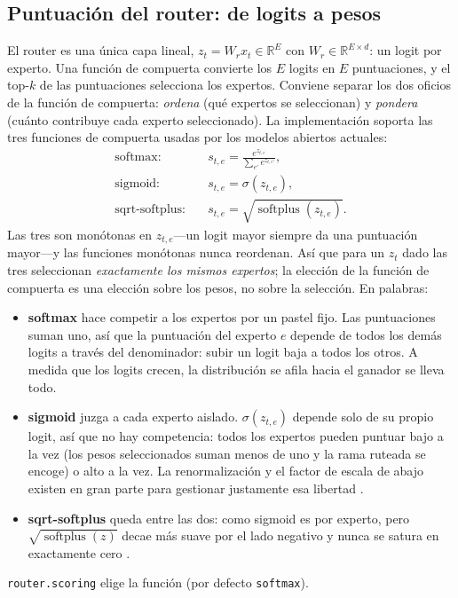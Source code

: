 \subsection{Puntuación del router: de logits a pesos}
\label{app:moe-router-es}

El router es una única capa lineal, $z_t = W_r x_t \in \mathbb{R}^{E}$ con
$W_r \in \mathbb{R}^{E \times d}$: un logit por experto. Una función de
compuerta convierte los $E$ logits en $E$ puntuaciones, y el top-$k$ de las
puntuaciones selecciona los expertos. Conviene separar los dos oficios de la
función de compuerta: \emph{ordena} (qué expertos se seleccionan) y
\emph{pondera} (cuánto contribuye cada experto seleccionado). La implementación
soporta las tres funciones de compuerta usadas por los modelos abiertos
actuales:
\begin{align}
  \text{softmax}:&\quad s_{t,e} = \frac{e^{z_{t,e}}}{\sum_{e'} e^{z_{t,e'}}}, \\
  \text{sigmoid}:&\quad s_{t,e} = \sigma(z_{t,e}), \\
  \text{sqrt-softplus}:&\quad s_{t,e} = \sqrt{\operatorname{softplus}(z_{t,e})}.
\end{align}
Las tres son monótonas en $z_{t,e}$---un logit mayor siempre da una puntuación
mayor---y las funciones monótonas nunca reordenan. Así que para un $z_t$ dado
las tres seleccionan \emph{exactamente los mismos expertos}; la elección de la
función de compuerta es una elección sobre los pesos, no sobre la selección.
En palabras:
\begin{itemize}[leftmargin=1.4em]
  \item \textbf{softmax} hace competir a los expertos por un pastel fijo. Las
        puntuaciones suman uno, así que la puntuación del experto $e$ depende
        de todos los demás logits a través del denominador: subir un logit
        baja a todos los otros. A medida que los logits crecen, la
        distribución se afila hacia el ganador se lleva todo.
  \item \textbf{sigmoid} juzga a cada experto aislado. $\sigma(z_{t,e})$
        depende solo de su propio logit, así que no hay competencia: todos los
        expertos pueden puntuar bajo a la vez (los pesos seleccionados suman
        menos de uno y la rama ruteada se encoge) o alto a la vez. La
        renormalización y el factor de escala de abajo existen en gran parte
        para gestionar justamente esa libertad \citep{deepseek2024v3}.
  \item \textbf{sqrt-softplus} queda entre las dos: como sigmoid es por
        experto, pero $\sqrt{\operatorname{softplus}(z)}$ decae más suave por
        el lado negativo y nunca se satura en exactamente cero
        \citep{deepseek2026v4}.
\end{itemize}
\texttt{router.scoring} elige la función (por defecto \texttt{softmax}).

